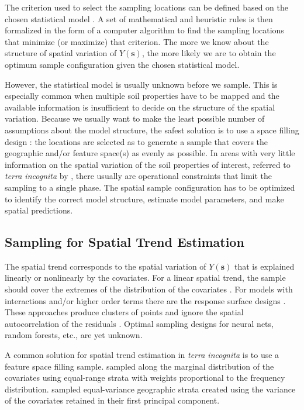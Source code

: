 The criterion used to select the sampling locations can be defined based on the chosen statistical model 
\cite{deGruijterEtAl2006, Mueller2007, WebsterEtAl2013}. A set of mathematical and heuristic rules is then 
formalized in the form of a computer algorithm to find the sampling locations that minimize (or maximize) that 
criterion. The more we know about the structure of spatial variation of $Y(\boldsymbol{s})$, the more likely we 
are to obtain the optimum sample configuration given the chosen statistical model.

However, the statistical model is usually unknown before we sample. This is especially common when multiple 
soil properties have to be mapped and the available information is insufficient to decide on the structure of 
the spatial variation. Because we usually want to make the least possible number of assumptions about the model 
structure, the safest solution is to use a space filling design \cite{HenglEtAl2003a, deGruijterEtAl2006, 
Mueller2007, WalvoortEtAl2010}: the locations are selected as to generate a sample that covers the geographic 
and/or feature space(s) as evenly as possible. In areas with very little information on the spatial variation 
of the soil properties of interest, referred to \emph{terra incognita} by \citet{WebsterEtAl2007}, there 
usually are operational constraints that limit the sampling to a single phase. The spatial sample configuration 
has to be optimized to identify the correct model structure, estimate model parameters, and make spatial 
predictions.

\subsection{Sampling for Spatial Trend Estimation}

The spatial trend corresponds to the spatial variation of $Y(\boldsymbol{s})$ that is explained linearly or 
nonlinearly by the covariates. For a linear spatial trend, the sample should cover the extremes of the 
distribution of the covariates \cite{Mueller2007}. For models with interactions and/or higher order terms there 
are the response surface designs \cite{BoxEtAl1951, LeschEtAl1995}. These approaches produce clusters of points 
and ignore the spatial autocorrelation of the residuals \cite{BrusEtAl2007a, Mueller2007}. Optimal sampling 
designs for neural nets, random forests, etc., are yet unknown.

A common solution for spatial trend estimation in \emph{terra incognita} is to use a feature space filling 
sample. \citet{HenglEtAl2003a} sampled along the marginal distribution of the covariates using equal-range 
strata with weights proportional to the frequency distribution. \citet{MinasnyEtAl2007a} sampled equal-variance 
geographic strata created using the variance of the covariates retained in their first principal component.

